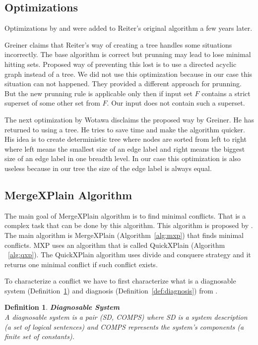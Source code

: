 \documentclass[12pt,a4paper]{article}
\newtheorem{definition}{Definition}[subsection]
\begin{document}
\subsection{Optimizations}
Optimizations by \cite{greinerReitersCorrection} and \cite{wotawaReitersVariant} were added to Reiter's original algorithm a few years later. 

Greiner claims that Reiter's way of creating a tree handles some situations incorrectly. The base algorithm is correct but prunning may lead to lose minimal hitting sets. Proposed way of preventing this lost is to use a directed acyclic graph instead of a tree. We did not use this optimization because in our case this situation can not happened. They provided a different approach for prunning. But the new prunning rule is applicable only then if input set $F$ contains a strict superset of some other set from $F$. Our input does not contain such a superset.

The next optimization by Wotawa disclaims the proposed way by Greiner. He has returned to using a tree. He tries to save time and make the algorithm quicker. His idea is to create deterministic tree where nodes are sorted from left to right where left means the smallest size of an edge label and right means the biggest size of an edge label in one breadth level. In our case this optimization is also useless because in our tree the size of the edge label is always equal.

\subsection{MergeXPlain Algorithm}
The main goal of MergeXPlain algorithm is to find minimal conflicts. That is a complex task that can be done by this algorithm. This algorithm is proposed by \cite{MXP}. The main algorithm is MergeXPlain (Algorithm~\ref{alg:mxp}) that finds minimal conflicts. MXP uses an algorithm that is called QuickXPlain (Algorithm ~\ref{alg:qxp}). The QuickXPlain algorithm uses divide and conquere strategy and it returns one minimal conflict if such conflict exists. 

To characterize a conflict we have to first characterize what is a diagnosable system (Definition~\ref{def:diagnosableSystem}) and diagnosis (Definition~\ref{def:diagnosis}) from \cite{reiterHS}.

\begin{definition}{\textbf{Diagnosable System}} \\
	\label{def:diagnosableSystem}
	\noindent A diagnosable system is a pair (SD, COMPS) where SD is a system description (a set of logical sentences) and COMPS represents the system's components (a finite set of constants).
\end{definition}
\end{document}
